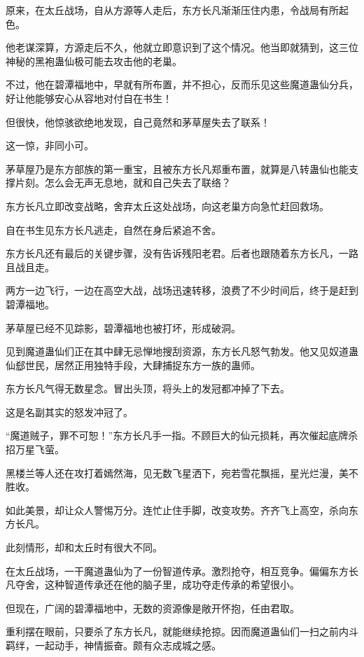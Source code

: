 
\begin{this_body}

原来，在太丘战场，自从方源等人走后，东方长凡渐渐压住内患，令战局有所起色。

他老谋深算，方源走后不久，他就立即意识到了这个情况。他当即就猜到，这三位神秘的黑袍蛊仙极可能去攻击他的老巢。

不过，他在碧潭福地中，早就有所布置，并不担心，反而乐见这些魔道蛊仙分兵，好让他能够安心从容地对付自在书生！

但很快，他惊骇欲绝地发现，自己竟然和茅草屋失去了联系！

这一惊，非同小可。

茅草屋乃是东方部族的第一重宝，且被东方长凡郑重布置，就算是八转蛊仙也能支撑片刻。怎么会无声无息地，就和自己失去了联络？

东方长凡立即改变战略，舍弃太丘这处战场，向这老巢方向急忙赶回救场。

自在书生见东方长凡逃走，自然在身后紧追不舍。

东方长凡还有最后的关键步骤，没有告诉残阳老君。后者也跟随着东方长凡，一路且战且走。

两方一边飞行，一边在高空大战，战场迅速转移，浪费了不少时间后，终于是赶到碧潭福地。

茅草屋已经不见踪影，碧潭福地也被打坏，形成破洞。

见到魔道蛊仙们正在其中肆无忌惮地搜刮资源，东方长凡怒气勃发。他又见奴道蛊仙郄世民，居然正用独特手段，大肆捕捉东方一族的蛊师。

东方长凡气得无数星念。冒出头顶，将头上的发冠都冲掉了下去。

这是名副其实的怒发冲冠了。

“魔道贼子，罪不可恕！”东方长凡手一指。不顾巨大的仙元损耗，再次催起底牌杀招万星飞萤。

黑楼兰等人还在攻打着嫣然海，见无数飞星洒下，宛若雪花飘摇，星光烂漫，美不胜收。

如此美景，却让众人警惕万分。连忙止住手脚，改变攻势。齐齐飞上高空，杀向东方长凡。

此刻情形，却和太丘时有很大不同。

在太丘战场，一干魔道蛊仙为了一份智道传承。激烈抢夺，相互竞争。偏偏东方长凡夺舍，这种智道传承还在他的脑子里，成功夺走传承的希望很小。

但现在，广阔的碧潭福地中，无数的资源像是敞开怀抱，任由君取。

重利摆在眼前，只要杀了东方长凡，就能继续抢掠。因而魔道蛊仙们一扫之前内斗羁绊，一起动手，神情振奋。颇有众志成城之感。


\end{this_body}
